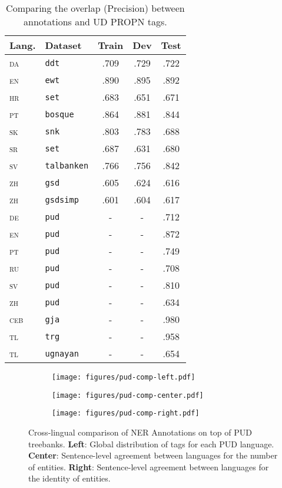 \begin{table}[t!]
\centering

\begin{tabular}{llccc}
\toprule
Lang. & Dataset & Train & Dev & Test \\
\midrule
\textsc{da} & \texttt{ddt} & .709 & .729 & .722 \\
\textsc{en} & \texttt{ewt} & .890 & .895 & .892 \\
\textsc{hr} & \texttt{set} & .683 & .651 & .671 \\
\textsc{pt} & \texttt{bosque} & .864 & .881 & .844 \\
\textsc{sk} & \texttt{snk} & .803 & .783 & .688 \\
\textsc{sr} & \texttt{set} & .687 & .631 & .680 \\
\textsc{sv} & \texttt{talbanken} & .766 & .756 & .842  \\
\textsc{zh} & \texttt{gsd} & .605 & .624 & .616 \\
\textsc{zh} & \texttt{gsdsimp} & .601 & .604 & .617 \\
\midrule
\textsc{de} & \texttt{pud} & - & - & .712 \\
\textsc{en} & \texttt{pud} & - & - & .872 \\
\textsc{pt} & \texttt{pud} & - & - & .749 \\
\textsc{ru} & \texttt{pud} & - & - & .708 \\
\textsc{sv} & \texttt{pud} & - & - & .810 \\
\textsc{zh} & \texttt{pud} & - & - & .634 \\
\midrule
\textsc{ceb} & \texttt{gja} & - & - & .980 \\
\textsc{tl} & \texttt{trg} & - & - & .958 \\
\textsc{tl} & \texttt{ugnayan} & - & - & .654 \\

\bottomrule
\end{tabular}\caption{Comparing the overlap (Precision) between \shortname{} annotations and UD PROPN tags.}
\label{tab:propn_overlap}
\end{table}


\begin{figure*}[ht]
\centering
\begin{subfigure}{0.32\textwidth}
    \texttt{[image: figures/pud-comp-left.pdf]}
\end{subfigure}
\hfill
\begin{subfigure}{0.32\textwidth}
    \texttt{[image: figures/pud-comp-center.pdf]}
\end{subfigure}
\hfill
\begin{subfigure}{0.32\textwidth}
    \texttt{[image: figures/pud-comp-right.pdf]}
\end{subfigure}
\caption{Cross-lingual comparison of NER Annotations on top of PUD treebanks. \textbf{Left}: Global distribution of tags for each PUD language. \textbf{Center}: Sentence-level agreement between languages for the number of entities. \textbf{Right}: Sentence-level agreement between languages for the identity of entities.}
\label{fig:pud-comp}
\end{figure*}

